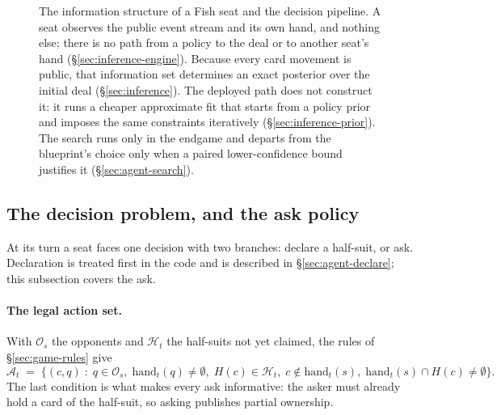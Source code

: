\begin{figure}[!ht]
\caption{The information structure of a Fish seat and the \sestina{} decision pipeline. A seat
observes the public event stream and its own hand, and nothing else; there is no path from a policy to
the deal or to another seat's hand (\S\ref{sec:inference-engine}). Because every card movement is public, that information set
determines an exact posterior over the initial deal (\S\ref{sec:inference}). The deployed path does
not construct it: it runs a cheaper approximate fit that starts from a policy prior and imposes the
same constraints iteratively (\S\ref{sec:inference-prior}). The search runs
only in the endgame and departs from the blueprint's choice only when a paired lower-confidence bound
justifies it (\S\ref{sec:agent-search}).}
\label{fig:pipeline}
\end{figure}

\begin{table}[!ht]\centering
\caption{Components of \sestina{} against \vsix{}. Harness identifiers appear in parentheses and
are used in the paper only where a command must be reproduced.}
\label{tab:components}
{\tabfont}
\end{table}

\subsection{The decision problem, and the ask policy}
\label{sec:agent-policy}

At its turn a seat faces one decision with two branches: declare a half-suit, or ask. Declaration is
treated first in the code and is described in \S\ref{sec:agent-declare}; this subsection covers the
ask.

\paragraph{The legal action set.} With $\mathcal{O}_s$ the opponents and $\mathcal{H}_t$ the
half-suits not yet claimed, the rules of \S\ref{sec:game-rules} give
\begin{equation}
  \mathcal{A}_t \;=\; \bigl\{(c,q) \;:\; q \in \mathcal{O}_s,\; \text{hand}_t(q) \neq \emptyset,\;
  H(c) \in \mathcal{H}_t,\; c \notin \text{hand}_t(s),\;
  \text{hand}_t(s) \cap H(c) \neq \emptyset \bigr\}.
  \label{eq:legal}
\end{equation}
The last condition is what makes every ask informative: the asker must already hold a card of the
half-suit, so asking publishes partial ownership.

